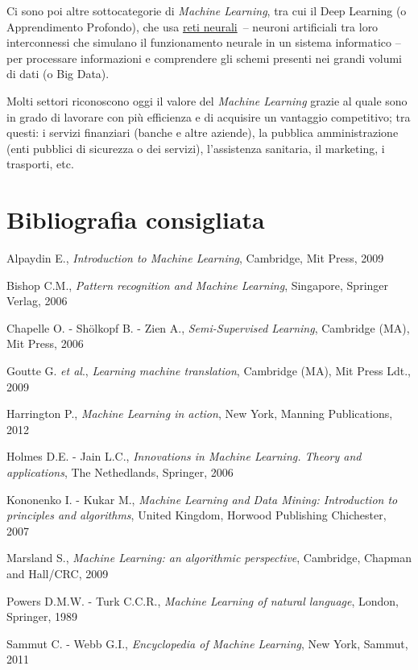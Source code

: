 \documentclass[
  b5paper,
  twoside,
  12pt,
  chapterprefix=false,
  bibliography=totocnumbered,
  parskip=false]{scrbook}
\begin{document}
Ci sono poi altre sottocategorie di \emph{Machine Learning}, tra cui il Deep
Learning (o Apprendimento Profondo), che usa \href{https://www.ai4business.it/intelligenza-artificiale/deep-learning/reti-neurali/}{reti
neurali}~--
neuroni artificiali tra loro interconnessi che simulano il funzionamento
neurale in un sistema informatico -- per processare informazioni e
comprendere gli schemi presenti nei grandi volumi di dati (o Big Data).

Molti settori riconoscono oggi il valore del \emph{Machine Learning} grazie
al quale sono in grado di lavorare con più efficienza e di acquisire un
vantaggio competitivo; tra questi: i servizi finanziari (banche e altre
aziende), la pubblica amministrazione (enti pubblici di sicurezza o dei
servizi), l'assistenza sanitaria, il marketing, i trasporti, etc.

\hypertarget{bibliografia-consigliata-14}{%
\section*{Bibliografia consigliata}\label{bibliografia-consigliata-14}}

Alpaydin E., \emph{Introduction to Machine Learning}, Cambridge, Mit Press,
2009

Bishop C.M., \emph{Pattern recognition and Machine Learning}, Singapore,
Springer Verlag, 2006

Chapelle O. - Shölkopf B. - Zien A., \emph{Semi-Supervised Learning},
Cambridge (MA), Mit Press, 2006

Goutte G. \emph{et al}., \emph{Learning machine translation}, Cambridge (MA), Mit
Press Ldt., 2009

Harrington P., \emph{Machine Learning in action}, New York, Manning
Publications, 2012

Holmes D.E. - Jain L.C., \emph{Innovations in Machine Learning. Theory and
applications}, The Nethedlands, Springer, 2006

Kononenko I. - Kukar M., \emph{Machine Learning and Data Mining: Introduction
to principles and algorithms}, United Kingdom, Horwood Publishing
Chichester, 2007

Marsland S., \emph{Machine Learning: an algorithmic perspective}, Cambridge,
Chapman and Hall/CRC, 2009

Powers D.M.W. - Turk C.C.R., \emph{Machine Learning of natural language},
London, Springer, 1989

Sammut C. - Webb G.I., \emph{Encyclopedia of Machine Learning}, New York,
Sammut, 2011
\end{document}
